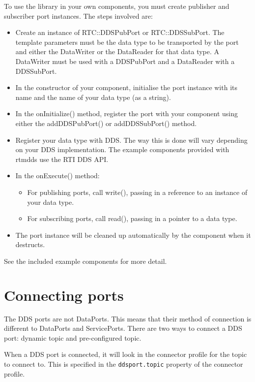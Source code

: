 \documentclass[a4paper,10pt]{article}
\newcommand{\ilcode}[1]{\lstinline|#1|}
\begin{document}
To use the library in your own components, you must create publisher and
subscriber port instances. The steps involved are:

\begin{itemize}
  \item Create an instance of RTC::DDSPubPort or RTC::DDSSubPort. The
  template parameters must be the data type to be transported by the
  port and either the DataWriter or the DataReader for that data type. A
  DataWriter must be used with a DDSPubPort and a DataReader with a
  DDSSubPort.
  \item In the constructor of your component, initialise the port
  instance with its name and the name of your data type (as a string).
  \item In the onInitialize() method, register the port with your
  component using either the addDDSPubPort() or addDDSSubPort() method.
  \item Register your data type with DDS. The way this is done will vary
  depending on your DDS implementation. The example components provided
  with rtmdds use the RTI DDS API.
  \item In the onExecute() method:
  \begin{itemize}
    \item For publishing ports, call write(), passing in a reference to
    an instance of your data type.
    \item For subscribing ports, call read(), passing in a pointer to a
    data type.
  \end{itemize}
  \item The port instance will be cleaned up automatically by the
  component when it destructs.
\end{itemize}

See the included example components for more detail.

\section{Connecting ports}
\label{sec:connecting}

The DDS ports are not DataPorts. This means that their method of
connection is different to DataPorts and ServicePorts. There are two
ways to connect a DDS port: dynamic topic and pre-configured topic.

When a DDS port is connected, it will look in the connector profile for
the topic to connect to. This is specified in the \ilcode{ddsport.topic}
property of the connector profile.
\end{document}
